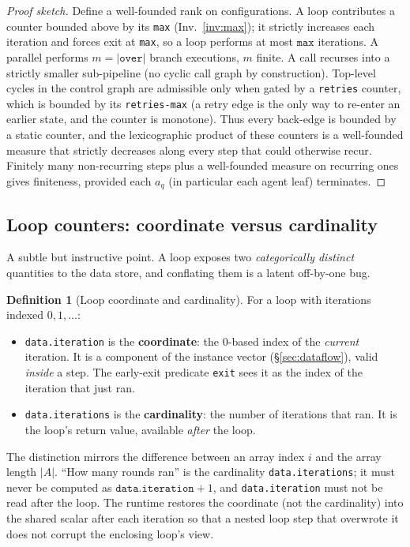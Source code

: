 \documentclass[11pt]{article}
\theoremstyle{plain}
\theoremstyle{definition}
\newtheorem{definition}[theorem]{Definition}
\theoremstyle{remark}
\newcommand{\code}[1]{\texttt{#1}}
\newcommand{\state}[1]{\textsf{#1}}
\begin{document}
\begin{proof}[Proof sketch]
Define a well-founded rank on configurations. A \state{loop} contributes a counter
bounded above by its \code{max} (Inv.~\ref{inv:max}); it strictly increases each
iteration and forces exit at \code{max}, so a loop performs at most $\code{max}$
iterations. A \state{parallel} performs $m = |\code{over}|$ branch executions, $m$
finite. A \state{call} recurses into a strictly smaller sub-pipeline (no cyclic
call graph by construction). Top-level cycles in the control graph are admissible
only when gated by a \code{retries} counter, which is bounded by its
\code{retries-max} (a retry edge is the only way to re-enter an earlier state, and
the counter is monotone). Thus every back-edge is bounded by a static counter, and
the lexicographic product of these counters is a well-founded measure that strictly
decreases along every step that could otherwise recur. Finitely many non-recurring
steps plus a well-founded measure on recurring ones gives finiteness, provided each
$a_q$ (in particular each agent leaf) terminates.
\end{proof}

\subsection{Loop counters: coordinate versus cardinality}\label{sec:loopcounters}

A subtle but instructive point. A loop exposes two \emph{categorically distinct}
quantities to the data store, and conflating them is a latent off-by-one bug.

\begin{definition}[Loop coordinate and cardinality]
For a loop with iterations indexed $0,1,\dots$:
\begin{itemize}[nosep]
  \item \code{data.iteration} is the \textbf{coordinate}: the $0$-based index of the
        \emph{current} iteration. It is a component of the instance vector
        (\S\ref{sec:dataflow}), valid \emph{inside} a step. The early-exit
        predicate \code{exit} sees it as the index of the iteration that just ran.
  \item \code{data.iterations} is the \textbf{cardinality}: the number of iterations
        that ran. It is the loop's return value, available \emph{after} the loop.
\end{itemize}
\end{definition}

The distinction mirrors the difference between an array index $i$ and the array
length $|A|$. ``How many rounds ran'' is the cardinality \code{data.iterations}; it
must never be computed as $\code{data.iteration}+1$, and \code{data.iteration} must
not be read after the loop. The runtime restores the coordinate (not the
cardinality) into the shared scalar after each iteration so that a nested loop step
that overwrote it does not corrupt the enclosing loop's view.
\end{document}
